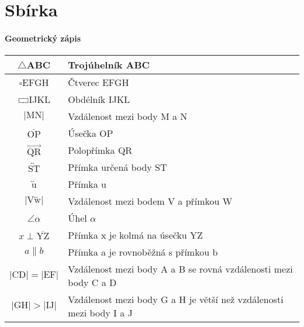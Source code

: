 \chapter{Sbírka}

\subsubsection{Geometrický zápis}
\begin{tabular}{|c|l|}
    \hline
    $\triangle$ABC                                         & Trojúhelník ABC                                                     \\ \hline
    $\square$EFGH                                          & Čtverec EFGH                                                        \\ \hline
    $\rectangle$IJKL                                       & Obdélník IJKL                                                       \\ \hline
    $\lvert \text{MN} \rvert$                              & Vzdálenost mezi body M a N                                          \\ \hline
    $\overline{\text{OP}}$                                 & Úsečka OP                                                           \\ \hline
    $\overrightarrow{\text{QR}}$                           & Polopřímka QR                                                       \\ \hline
    $\overleftrightarrow{\text{ST}}$                       & Přímka určená body ST                                               \\ \hline
    $\overleftrightarrow{\text{u}}$                        & Přímka u                                                            \\ \hline
    $\lvert \text{V} \overleftrightarrow{\text{w}} \rvert$ & Vzdálenost mezi bodem V a přímkou W                                 \\ \hline
    $\angle \alpha $                                       & Úhel $\alpha$                                                       \\ \hline
    $ x \perp \overline{\text{YZ}} $                       & Přímka x je kolmá na úsečku YZ                                      \\ \hline
    $a \| b$                                               & Přímka a je rovnoběžná s přímkou b                                  \\ \hline
    $\lvert \text{CD} \rvert = \lvert \text{EF} \rvert$    & Vzdálenost mezi body A a B se rovná vzdálenosti mezi body C a D     \\ \hline
    $\lvert \text{GH} \rvert > \lvert \text{IJ} \rvert$    & Vzdálenost mezi body G a H je větší než vzdálenosti mezi body I a J \\ \hline
\end{tabular}

\newpage
